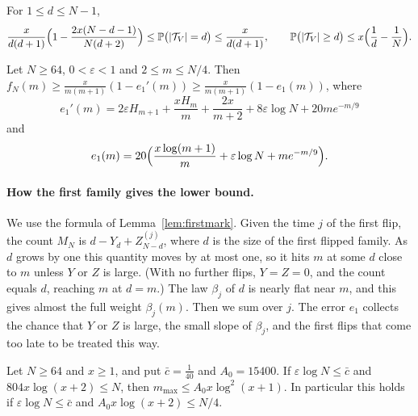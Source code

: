 \begin{lemma}\label{lem:B-D}
For $1\le d\le N-1$,
\[
 \frac{x}{d(d+1)}\Bigl(1-\frac{2x(N-d-1)}{N(d+2)}\Bigr)\le\mathbb{P}\bigl(\lvert\mathcal T_V\rvert=d\bigr)\le\frac{x}{d(d+1)},
 \qquad\mathbb{P}\bigl(\lvert\mathcal T_V\rvert\ge d\bigr)\le x\Bigl(\frac1d-\frac1N\Bigr).
\]
\end{lemma}


\begin{proposition}\label{thm:B-local-lower}
Let $N\ge64$, $0<\varepsilon<1$ and $2\le m\le N/4$. Then
$f_N(m)\ge\frac{x}{m(m+1)}(1-e_1'(m))\ge\frac{x}{m(m+1)}(1-e_1(m))$, where
\[
 e_1'(m)=2\varepsilon H_{m+1}+\frac{xH_m}m+\frac{2x}{m+2}+8\varepsilon\log N+20me^{-m/9}
\]
and
\[
 e_1(m)=20\Bigl(\frac{x\log(m+1)}m+\varepsilon\log N+me^{-m/9}\Bigr).
\]
\end{proposition}

\paragraph{How the first family gives the lower bound.}
We use the formula of Lemma~\ref{lem:firstmark}. Given the time $j$ of the
first flip, the count $M_N$ is $d-Y_d+Z^{(j)}_{N-d}$, where $d$ is the size
of the first flipped family. As $d$ grows by one this quantity moves by at
most one, so it hits $m$ at some $d$ close to $m$ unless $Y$ or $Z$ is
large. (With no further flips, $Y=Z=0$, and the count equals $d$, reaching $m$ at $d=m$.) The law $\beta_j$ of $d$ is nearly flat near $m$, and this gives
almost the full weight $\beta_j(m)$. Then we sum over $j$. The error
$e_1$ collects the chance that $Y$ or $Z$ is large, the small
slope of $\beta_j$, and the first flips that come too late to be treated
this way.


\begin{lemma}\label{lem:B-mode}
Let $N\ge64$ and $x\ge1$, and put $\bar c=\frac1{40}$ and $A_0=15400$. If $\varepsilon\log
N\le\bar c$ and $804x\log(x+2)\le N$, then $m_{\max}\le A_0x\log^2(x+1)$. In particular this holds if
$\varepsilon\log N\le\bar c$ and $A_0x\log(x+2)\le N/4$.
\end{lemma}
